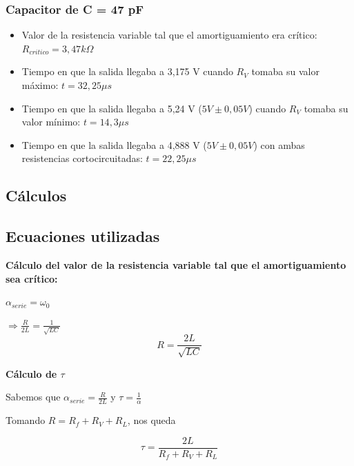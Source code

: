 \documentclass{article}
\begin{document}
        \subsubsection*{Capacitor de C = 47 pF}
            \begin{itemize}
                \item Valor de la resistencia variable tal que el amortiguamiento era crítico: $ R_{critico} = 3,47 k\Omega $
                \item Tiempo en que la salida llegaba a 3,175 V cuando $ R_V $ tomaba su valor máximo: $ t = 32,25 \mu s$
                \item Tiempo en que la salida llegaba a 5,24 V ($ 5V \pm 0,05V $) cuando $ R_V $ tomaba su valor mínimo:  $ t = 14,3 \mu s$ %
                \item Tiempo en que la salida llegaba a 4,888 V ($ 5V \pm 0,05V $) con ambas resistencias cortocircuitadas: $ t = 22,25 \mu s$
            \end{itemize}

    \subsection{Cálculos}

        \subsection{Ecuaciones utilizadas}
            \textbf{Cálculo del valor de la resistencia variable tal que el amortiguamiento sea crítico:} \par \par
            $ \alpha_{serie} = \omega_0 $ \par \par
            $ \Rightarrow \frac{R}{2L} = \frac{1}{\sqrt{LC}} $
            \begin{equation}
                R = \frac{2L}{\sqrt{LC}}
            \end{equation}
            
            \par \par 

            \textbf{Cálculo de $ \tau $} \par \par
            Sabemos que $ \alpha_{serie} = \frac{R}{2L} $ y $ \tau = \frac{1}{\alpha} $  \par \par
            Tomando $ R = R_f + R_V + R_L $, nos queda \par \par
            \begin{equation}
                \tau = \frac{2L}{R_f + R_V + R_L} 
            \end{equation}
\end{document}
